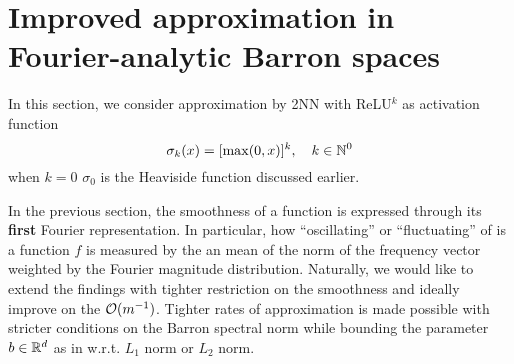 


\section{Improved approximation in Fourier-analytic Barron spaces}

In this section, we consider approximation by 2NN with ReLU$^k$ as activation
function
\begin{equation}
    \sigma_k(x) = [\max(0, x)]^k, \quad k \in \mathbb{N}^0
\end{equation}
when $k = 0$ $\sigma_0$ is the Heaviside function discussed earlier.



In the previous section, the smoothness of a function is expressed through its
\textbf{first} Fourier representation. In particular, how ``oscillating'' or
``fluctuating'' of is a function $f$ is measured by the an mean of the norm of
the frequency vector weighted by the Fourier magnitude distribution. Naturally,
we would like to extend the findings with tighter restriction on the smoothness
and ideally improve on the $\mathcal{O}(m^{-1})$. Tighter rates of approximation is
made possible with stricter conditions on the Barron spectral norm while
bounding the parameter $b\in\mathbb{R}^d$ as in \TOCITE w.r.t. $L_1$ norm or $L_2$ norm. 

